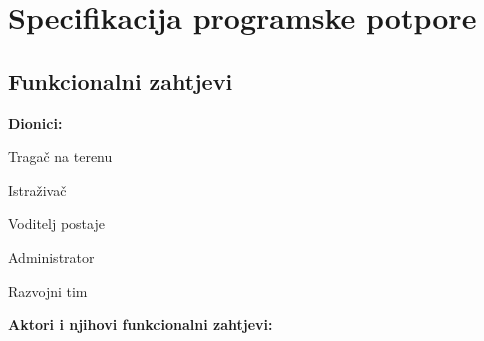 \chapter{Specifikacija programske potpore}
		
	\section{Funkcionalni zahtjevi}
			
			\noindent \textbf{Dionici:}
			
			\begin{packed_enum}
				\item Tragač na terenu
				\item Istraživač				
				\item Voditelj postaje
				\item Administrator
				\item Razvojni tim
				
			\end{packed_enum}
			
			\noindent \textbf{Aktori i njihovi funkcionalni zahtjevi:}
			
